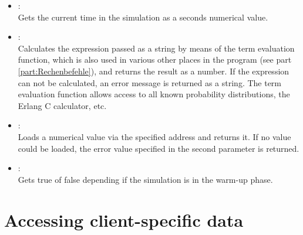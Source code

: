 \begin{itemize}

\item
{}:\\
Gets the current time in the simulation as a seconds numerical value.

\item
{}:\\
Calculates the expression passed as a string by means of the term evaluation function,
which is also used in various other places in the program (see part \ref{part:Rechenbefehle}),
and returns the result as a number. If the expression can not be calculated, an error message is returned as a string.
The term evaluation function allows access to all known probability distributions,
the Erlang C calculator, etc.

\item
{}:\\
Loads a numerical value via the specified address and returns it.
If no value could be loaded, the error value specified in the second parameter is returned.

\item
{}:\\
Gets true of false depending if the simulation is in the warm-up phase.

\end{itemize}

\section{Accessing client-specific data}

